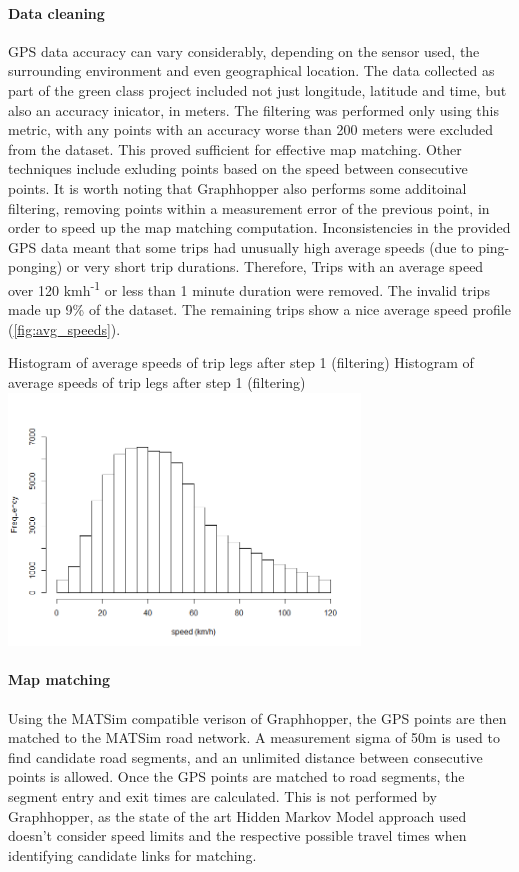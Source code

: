 \paragraph{Data cleaning}
GPS data accuracy can vary considerably, depending on the sensor used, the surrounding environment and even geographical location. 
The data collected as part of the green class project included not just longitude, latitude and time, but also an accuracy inicator, in meters. 
The filtering was performed only using this metric, with any points with an accuracy worse than 200 meters were excluded from the dataset. 
This proved sufficient for effective map matching. Other techniques include exluding points based on the speed between consecutive points. 
It is worth noting that Graphhopper also performs some additoinal filtering, removing points within a measurement error of the previous point, in order to speed up the map matching computation. Inconsistencies in the provided GPS data meant that some trips had unusually high average speeds (due to ping-ponging) or very short trip durations. Therefore, Trips with an average speed over 120 kmh\textsuperscript{-1} or less than 1 minute duration were removed. The invalid trips made up 9\% of the dataset. The remaining trips show a nice average speed profile (\ref{fig:avg_speeds}).

\createfigure%
	{Histogram of average speeds of trip legs after step 1 (filtering)}
	{Histogram of average speeds of trip legs after step 1 (filtering)}
    {\label{fig:avg_speeds}}
    {\includegraphics[width=0.7\textwidth]{figures/avg_speed_green_class_matched}}
	{}

\paragraph{Map matching}
Using the MATSim compatible verison of Graphhopper, the GPS points are then matched to the MATSim road network. A measurement sigma of 50m is used to find candidate road segments, and an unlimited distance between consecutive points is allowed. Once the GPS points are matched to road segments, the segment entry and exit times are calculated. 
This is not performed by Graphhopper, as the state of the art Hidden Markov Model approach used \citep{newson2009hidden} doesn't consider speed limits and the respective possible travel times when identifying candidate links for matching.

